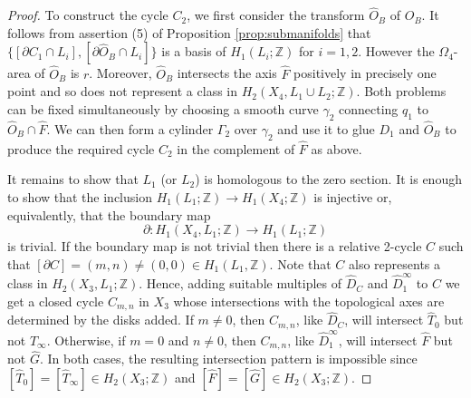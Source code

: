 \documentclass[10pt,a4paper]{amsart}
\newcommand{\ZZ}{{\mathbb Z}}
\begin{document}
\begin{proof}
To construct the cycle $C_2$, we first consider the transform $\hat{O}_B$ of $O_B$. It follows from assertion (5) of Proposition \ref{prop:submanifolds} that 
$\{[\partial C_1 \cap L_i], [\partial \hat{O}_B \cap L_i]\}$ is a basis of  $H_1(L_i;\ZZ)$ for $i=1,2$.
However the $\Omega_4$-area of $\hat{O}_B$ is $r$. Moreover, $\hat{O}_B$ intersects the axis $\hat{F}$ positively in precisely one point and so does not represent a class in $H_2(X_4, L_1 \cup L_2;\ZZ)$. Both problems can be fixed simultaneously by choosing a smooth curve $\gamma_2$ connecting $q_1$ to $\hat{O}_B \cap \hat{F}$. We can then form a cylinder $\Gamma_2$ over $\gamma_2$ and use it to glue $D_1$ and $\hat{O}_B$ to produce the required cycle $C_2$ in the complement of $\hat{F}$ as above.


It remains to show that $L_1$ (or $L_2$) is homologous to the zero section. It is enough to show that the inclusion $H_1(L_1;\ZZ) \to H_1(X_4;\ZZ)$ is injective or, equivalently, that the boundary map $$\partial \colon H_1(X_4,L_1;\ZZ) \to H_1(L_1;\ZZ)$$ is trivial. If the boundary map is not trivial then there is a relative 2-cycle $C$ such that $[\partial C] = (m,n) \neq (0,0) \in H_1(L_1, \ZZ).$ Note that $C$ also represents a class in $H_2(X_3, L_1;\ZZ)$. Hence, adding suitable multiples of $\hat{D}_C$ and $\hat{D}_1^{\infty}$ to $C$ we get a closed cycle $C_{m,n}$ in $X_3$ whose intersections with the topological axes are determined by the disks added. If $m\neq 0$, then $C_{m,n}$, like $\hat{D}_C$,  will intersect $\hat{T}_0$ but not $\hat{T}_{\infty}$. Otherwise, if $m=0$ and $n\neq0$, then $C_{m,n}$, like $\hat{D}_1^{\infty}$,  will intersect $\hat{F}$ but not $\hat{G}$. In both cases, the resulting intersection pattern is impossible since $[\hat{T}_0]=[\hat{T}_{\infty}] \in H_2(X_3;\ZZ)$ and $[\hat{F}] =[\hat{G}]\in H_2(X_3;\ZZ)$.
\end{proof}
\end{document}
